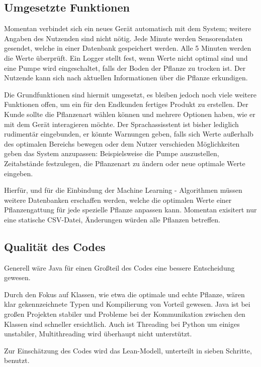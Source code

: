 \subsection{Umgesetzte Funktionen}
Momentan verbindet sich ein neues Gerät automatisch mit dem System; weitere Angaben des Nutzenden sind nicht nötig. Jede Minute werden Sensorendaten gesendet, welche in einer Datenbank gespeichert werden. Alle 5 Minuten werden die Werte überprüft. Ein Logger stellt fest, wenn Werte nicht optimal sind und eine Pumpe wird eingeschaltet, falls der Boden der Pflanze zu trocken ist. Der Nutzende kann sich nach aktuellen Informationen über die Pflanze erkundigen.

Die Grundfunktionen sind hiermit umgesetzt, es bleiben jedoch noch viele weitere Funktionen offen, um ein für den Endkunden fertiges Produkt zu erstellen. Der Kunde sollte die Pflanzenart wählen können und mehrere Optionen haben, wie er mit dem Gerät interagieren möchte. Der Sprachassisstent ist bisher lediglich rudimentär eingebunden, er könnte Warnungen geben, falls sich Werte außerhalb des optimalen Bereichs bewegen oder dem Nutzer verschieden Möglichkeiten geben das System anzupassen: Beispielsweise die Pumpe auszustellen, Zeitabstände festzulegen, die Pflanzenart zu ändern oder neue optimale Werte eingeben.

Hierfür, und für die Einbindung der Machine Learning - Algorithmen müssen weitere Datenbanken erschaffen werden, welche die optimalen Werte einer Pflanzengattung für jede spezielle Pflanze anpassen kann. Momentan exisitert nur eine statische CSV-Datei, Änderungen würden alle Pflanzen betreffen.

\subsection{Qualität des Codes}
Generell wäre Java für einen Großteil des Codes eine bessere Entscheidung gewesen.\cite{intellectsoft2023java} 

Durch den Fokus auf Klassen, wie etwa die optimale und echte Pflanze, wären klar gekennzeichnete Typen und Kompilierung von Vorteil gewesen. Java ist bei großen Projekten stabiler und Probleme bei der Kommunikation zwischen den Klassen sind schneller ersichtlich. Auch ist Threading bei Python um einiges unstabiler, Multithreading wird überhaupt nicht unterstützt. 

Zur Einschätzung des Codes wird das Lean-Modell, unterteilt in sieben Schritte, benutzt.\cite{lutkevich2024lean}

